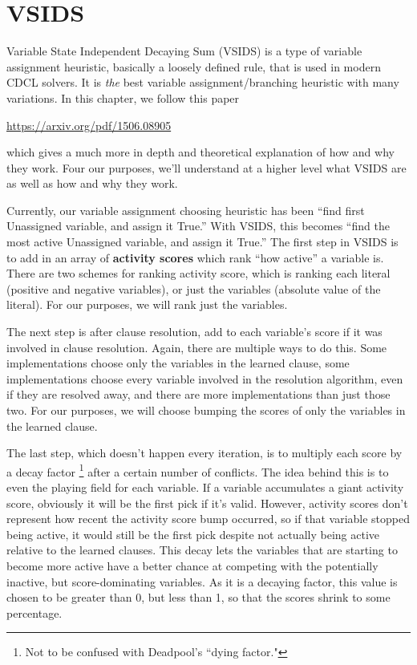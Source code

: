 \documentclass[../main.tex]{subfiles}
\begin{document}
\section{VSIDS}

Variable State Independent Decaying Sum (VSIDS) is a type of variable assignment 
heuristic, basically a loosely defined rule, that is used in modern CDCL solvers.
It is \textit{the} best variable assignment/branching heuristic with many variations.
In this chapter, we follow this paper
\begin{center}
    \url{https://arxiv.org/pdf/1506.08905}
\end{center}
which gives a much more in depth and theoretical explanation of how and why they work.
Four our purposes, we'll understand at a higher level what VSIDS are as well as how 
and why they work. 

Currently, our variable assignment choosing heuristic has been ``find first Unassigned
variable, and assign it True.'' With VSIDS, this becomes ``find the most active Unassigned
variable, and assign it True.'' The first step in VSIDS is to add in an array of
\textbf{activity scores} which rank ``how active'' a variable is. There are two schemes 
for ranking activity score, which is ranking each literal (positive and negative variables),
or just the variables (absolute value of the literal). For our purposes, we will rank just 
the variables. 

The next step is after clause resolution, add to each variable's score if it was involved 
in clause resolution. Again, there are multiple ways to do this. Some implementations choose 
only the variables in the learned clause, some implementations choose every variable involved 
in the resolution algorithm, even if they are resolved away, and there are more implementations 
than just those two. For our purposes, we will choose bumping the scores of only the variables 
in the learned clause.

The last step, which doesn't happen every iteration, is to multiply each score by a decay factor 
\footnote{Not to be confused with Deadpool's ``dying factor."}
after a certain number of conflicts. The idea behind this is to even the playing field for 
each variable. If a variable accumulates a giant activity score, obviously it will be the first 
pick if it's valid. However, activity scores don't represent how recent the activity score bump 
occurred, so if that variable stopped being active, it would still be the first pick despite 
not actually being active relative to the learned clauses. This decay lets the variables that 
are starting to become more active have a better chance at competing with the potentially 
inactive, but score-dominating variables. As it is a decaying factor, this value is chosen 
to be greater than 0, but less than 1, so that the scores shrink to some percentage.
\end{document}

